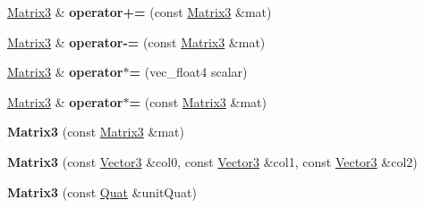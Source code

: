 \begin{DoxyCompactItemize}
\item 
\hypertarget{classVectormath_1_1Soa_1_1Matrix3_a51aeb0e6831ede08b6fe1bc81a9d07df}{\hyperlink{classVectormath_1_1Soa_1_1Matrix3}{Matrix3} \& {\bfseries operator+=} (const \hyperlink{classVectormath_1_1Soa_1_1Matrix3}{Matrix3} \&mat)}\label{classVectormath_1_1Soa_1_1Matrix3_a51aeb0e6831ede08b6fe1bc81a9d07df}

\item 
\hypertarget{classVectormath_1_1Soa_1_1Matrix3_a557dd00471c72f65cb8614bc7721f84c}{\hyperlink{classVectormath_1_1Soa_1_1Matrix3}{Matrix3} \& {\bfseries operator-\/=} (const \hyperlink{classVectormath_1_1Soa_1_1Matrix3}{Matrix3} \&mat)}\label{classVectormath_1_1Soa_1_1Matrix3_a557dd00471c72f65cb8614bc7721f84c}

\item 
\hypertarget{classVectormath_1_1Soa_1_1Matrix3_af3da1f7b8f11b97050c3fc108ce04f58}{\hyperlink{classVectormath_1_1Soa_1_1Matrix3}{Matrix3} \& {\bfseries operator$\ast$=} (vec\-\_\-float4 scalar)}\label{classVectormath_1_1Soa_1_1Matrix3_af3da1f7b8f11b97050c3fc108ce04f58}

\item 
\hypertarget{classVectormath_1_1Soa_1_1Matrix3_ade336f5055f2717124fa94fcc509da93}{\hyperlink{classVectormath_1_1Soa_1_1Matrix3}{Matrix3} \& {\bfseries operator$\ast$=} (const \hyperlink{classVectormath_1_1Soa_1_1Matrix3}{Matrix3} \&mat)}\label{classVectormath_1_1Soa_1_1Matrix3_ade336f5055f2717124fa94fcc509da93}

\item 
\hypertarget{classVectormath_1_1Soa_1_1Matrix3_a4ab9fc5d4e0b2bb2a48ed18070affd32}{{\bfseries Matrix3} (const \hyperlink{classVectormath_1_1Soa_1_1Matrix3}{Matrix3} \&mat)}\label{classVectormath_1_1Soa_1_1Matrix3_a4ab9fc5d4e0b2bb2a48ed18070affd32}

\item 
\hypertarget{classVectormath_1_1Soa_1_1Matrix3_a737743e03f4c6e06e82f8b3a721facb9}{{\bfseries Matrix3} (const \hyperlink{classVectormath_1_1Soa_1_1Vector3}{Vector3} \&col0, const \hyperlink{classVectormath_1_1Soa_1_1Vector3}{Vector3} \&col1, const \hyperlink{classVectormath_1_1Soa_1_1Vector3}{Vector3} \&col2)}\label{classVectormath_1_1Soa_1_1Matrix3_a737743e03f4c6e06e82f8b3a721facb9}

\item 
\hypertarget{classVectormath_1_1Soa_1_1Matrix3_a6577384ec4233a1b75128a553a547c07}{{\bfseries Matrix3} (const \hyperlink{classVectormath_1_1Soa_1_1Quat}{Quat} \&unit\-Quat)}\label{classVectormath_1_1Soa_1_1Matrix3_a6577384ec4233a1b75128a553a547c07}


\end{DoxyCompactItemize}
